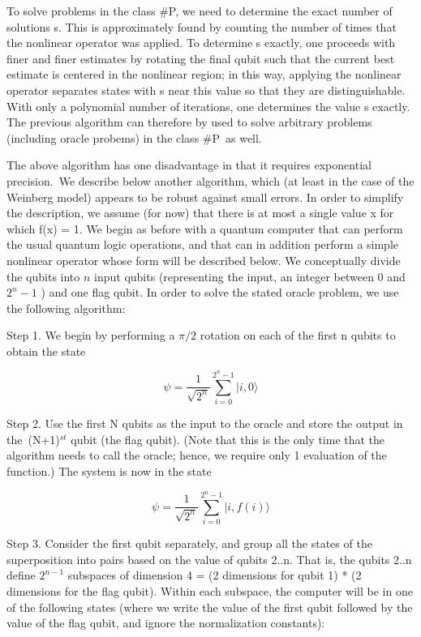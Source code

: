 \documentclass[12pt]{article}
\begin{document}
To solve problems in the class \#P, we need to determine the exact number of
solutions s. This is approximately found by counting the number of times that
the nonlinear operator was applied. To determine s exactly, one proceeds with
finer and finer estimates by rotating the final qubit such that the current
best estimate is centered in the nonlinear region; in this way, applying the
nonlinear operator separates states with s near this value so that they are
distinguishable. With only a polynomial number of iterations, one determines
the value s exactly. The previous algorithm can therefore by used to solve
arbitrary problems (including oracle probems) in the class \#P\ as well.

The above algorithm has one disadvantage in that it requires exponential
precision.\ We describe below another algorithm, which (at least in the case
of the Weinberg model) appears to be robust against small errors. In order to
simplify the description, we assume (for now) that there is at most a single
value x for which f(x) = 1. We begin as before with a quantum computer that
can perform the usual quantum logic operations, and that can in addition
perform a simple nonlinear operator whose form will be described below. We
conceptually divide the qubits into $n$ input qubits (representing the input,
an integer between 0 and $2^{n}-1$ ) and one flag qubit. In order to solve the
stated oracle problem, we use the following algorithm:

Step 1. We begin by performing a $\pi/2$ rotation on each of the first n
qubits to obtain the state%

\begin{equation}
\psi=\frac{1}{\sqrt{2^{n}}}\sum\limits_{i=0}^{2^{n}-1}|i,0\rangle
\end{equation}

Step 2. Use the first N qubits as the input to the oracle and store the output
in the\ (N+1)$^{st}$ qubit (the flag qubit). (Note that this is the only time
that the algorithm needs to call the oracle; hence, we require only 1
evaluation of the function.) The system is now in the state%

\begin{equation}
\psi=\frac{1}{\sqrt{2^{n}}}\sum\limits_{i=0}^{2^{n}-1}|i,f(i)\rangle
\end{equation}

Step 3. Consider the first qubit separately, and group all the states of the
superposition into pairs based on the value of qubits 2..n. That is, the
qubits 2..n define $2^{n-1}$ subspaces of dimension 4 = (2 dimensions for
qubit 1) * (2 dimensions for the flag qubit). Within each subspace, the
computer will be in one of the following states (where we write the value of
the first qubit followed by the value of the flag qubit, and ignore the
normalization constants):%
\end{document}
